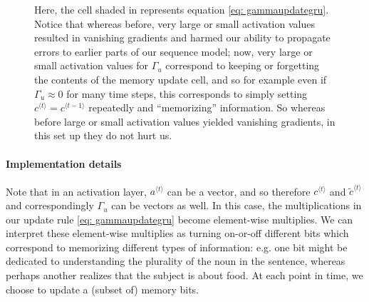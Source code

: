 \documentclass[12pt]{article}
\begin{document}
\begin{figure}[h]
  \centering
  \caption{\footnotesize Here, the cell shaded in \color{purple!50}{purple} \color{black} represents equation \ref{eq: gammaupdategru}. Notice that whereas before, very large or small activation values resulted in vanishing gradients and harmed our ability to propagate errors to earlier parts of our sequence model; now, very large or small activation values for $\Gamma_u$ correspond to keeping or forgetting the contents of the memory update cell, and so for example even if $\Gamma_u \approx 0$ for many time steps, this corresponds to simply setting $c^{\langle t \rangle} = c^{\langle t - 1 \rangle}$ repeatedly and ``memorizing'' information. So whereas before large or small activation values yielded vanishing gradients, in this set up they do not hurt us.}
\end{figure}
\paragraph{Implementation details} Note that in an activation layer,
$a^{\langle t \rangle}$ can be a vector, and so therefore
$c^{\langle t \rangle}$ and $\tilde c^{\langle t \rangle}$ and correspondingly $\Gamma_u$ can be vectors as well. In this case, the multiplications in our update rule \ref{eq: gammaupdategru} become element-wise multiplies. We can interpret these element-wise multiplies as turning on-or-off different bits which correspond to memorizing different types of information: e.g. one bit might be dedicated to understanding the plurality of the noun in the sentence, whereas perhaps another realizes that the subject is about food. At each point in time, we choose to update a (subset of) memory bits.
\end{document}
